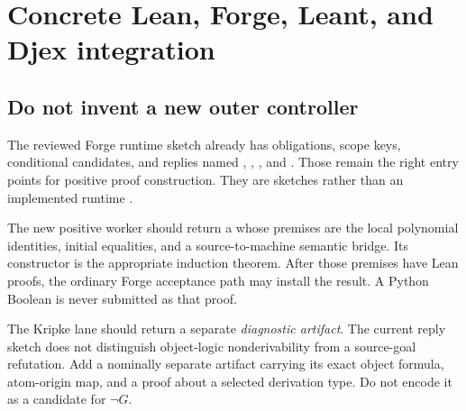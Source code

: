 \section{Concrete Lean, Forge, Leant, and Djex integration}
\label{sec:integration}

\subsection{Do not invent a new outer controller}
The reviewed Forge runtime sketch already has obligations, scope keys,
conditional candidates, and replies named , ,
, and . Those remain the right entry points for
positive proof construction. They are sketches rather than an implemented
 runtime \cite{forge-runtime}.

The new positive worker should return a  whose
premises are the local polynomial identities, initial equalities, and a
source-to-machine semantic bridge. Its constructor is the appropriate
induction theorem. After those premises have Lean proofs, the ordinary Forge
acceptance path may install the result. A Python Boolean is never submitted as
that proof.

The Kripke lane should return a separate \emph{diagnostic artifact}. The
current reply sketch does not distinguish object-logic nonderivability from a
source-goal refutation. Add a nominally separate artifact carrying its exact
object formula, atom-origin map, and a proof about a selected derivation type.
Do not encode it as a candidate for $\neg G$.

